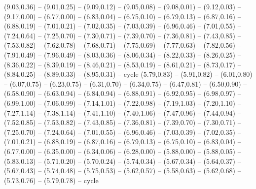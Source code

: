 \expandafter\def\csname geo:gebiet:heute-HRV\endcsname{
  (9.03,0.36) -- (9.01,0.25) -- (9.09,0.12) -- (9.05,0.08) -- (9.08,0.01) -- (9.12,0.03) -- (9.17,0.00) -- (6.77,0.00) -- (6.83,0.04) -- (6.75,0.10) -- (6.79,0.13) -- (6.87,0.16) -- (6.88,0.19) -- (7.01,0.21) -- (7.02,0.35) -- (7.03,0.39) -- (6.96,0.46) -- (7.01,0.55) -- (7.24,0.64) -- (7.25,0.70) -- (7.30,0.71) -- (7.39,0.70) -- (7.36,0.81) -- (7.43,0.85) -- (7.53,0.82) -- (7.62,0.78) -- (7.68,0.71) -- (7.75,0.69) -- (7.77,0.63) -- (7.82,0.56) -- (7.91,0.49) -- (7.96,0.49) -- (8.03,0.36) -- (8.06,0.34) -- (8.22,0.33) -- (8.26,0.25) -- (8.36,0.22) -- (8.39,0.19) -- (8.46,0.21) -- (8.53,0.19) -- (8.61,0.21) -- (8.73,0.17) -- (8.84,0.25) -- (8.89,0.33) -- (8.95,0.31) -- cycle}
\expandafter\def\csname geo:gebiet:heute-SVN\endcsname{
  (5.79,0.83) -- (5.91,0.82) -- (6.01,0.80) -- (6.07,0.75) -- (6.23,0.75) -- (6.31,0.70) -- (6.34,0.75) -- (6.47,0.81) -- (6.50,0.90) -- (6.58,0.90) -- (6.63,0.94) -- (6.84,0.94) -- (6.88,0.91) -- (6.92,0.95) -- (6.98,0.97) -- (6.99,1.00) -- (7.06,0.99) -- (7.14,1.01) -- (7.22,0.98) -- (7.19,1.03) -- (7.20,1.10) -- (7.27,1.14) -- (7.38,1.14) -- (7.41,1.10) -- (7.40,1.06) -- (7.47,0.96) -- (7.44,0.94) -- (7.52,0.85) -- (7.53,0.82) -- (7.43,0.85) -- (7.36,0.81) -- (7.39,0.70) -- (7.30,0.71) -- (7.25,0.70) -- (7.24,0.64) -- (7.01,0.55) -- (6.96,0.46) -- (7.03,0.39) -- (7.02,0.35) -- (7.01,0.21) -- (6.88,0.19) -- (6.87,0.16) -- (6.79,0.13) -- (6.75,0.10) -- (6.83,0.04) -- (6.77,0.00) -- (6.35,0.00) -- (6.34,0.06) -- (6.28,0.00) -- (5.88,0.00) -- (5.88,0.05) -- (5.83,0.13) -- (5.71,0.20) -- (5.70,0.24) -- (5.74,0.34) -- (5.67,0.34) -- (5.64,0.37) -- (5.67,0.43) -- (5.74,0.48) -- (5.75,0.53) -- (5.62,0.57) -- (5.58,0.63) -- (5.62,0.68) -- (5.73,0.76) -- (5.79,0.78) -- cycle}
\def\GebietListe{1938-Luxembourg,1938-Switzerland,1938-Latvia,1938-Lithuania,1938-Belgium,1938-France,1938-Netherlands,1938-Romania,1938-Czechoslovakia,1938-Hungary,1938-Reich,1938-Poland,1938-Sweden,1938-Denmark,1938-Yugoslavia,1938-Italy,1945-Luxembourg,1945-Switzerland,1945-Belgium,1945-Hungary,1945-Romania,1945-Denmark,1945-Poland,1945-Netherlands,1945-Austria,1945-Sweden,1945-Czechoslovakia,1945-USSR,1945-SOV,1945-SaarProtectorate,1945-Yugoslavia,1945-Italy,1945-UK,1945-USA,1945-FRA,1945-France,heute-FRA,heute-UKR,heute-BLR,heute-LTU,heute-RUS,heute-CZE,heute-LVA,heute-SWE,heute-LUX,heute-BEL,heute-DNK,heute-ROU,heute-HUN,heute-SVK,heute-POL,heute-AUT,heute-ITA,heute-CHE,heute-NLD,heute-LIE,heute-SRB,heute-HRV,heute-SVN}



